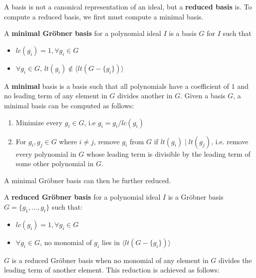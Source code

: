 A \Grobner basis is not a canonical representation of an ideal, but a
{\bf reduced \Grobner basis} is. To compute a reduced \Grobner basis, we
first must compute a minimal \Grobner basis.

\begin{Definition}\label{def:minigb}
A {\bf minimal Gr\"obner basis} for a polynomial ideal $I$ is a \Grobner basis $G$ for $I$ such that
	\begin{itemize}
		\item $lc(g_{i})=1,\forall g_{i}\in G$
		\item $\forall g_{i} \in G$,  $lt(g_{i}) \notin \langle lt(G-\{g_{i}\})\rangle$
	\end{itemize}
\end{Definition}
A {\bf minimal} \Grobner basis is a \Grobner basis such that all polynomials
have a coefficient of $1$ and no leading term of any element in $G$ divides 
another in $G$.
Given a \Grobner basis $G$, a minimal \Grobner basis can be
computed as follows:
\begin{enumerate}
\item Minimize every $g_i \in G$, i.e $g_i=g_i/lc(g_i)$
\item For $g_i, g_j \in G$ where $i\neq j$, remove $g_i$ from $G$ if $lt(g_i)\mid lt(g_j)$, i.e. remove every polynomial in $G$ whose leading term is divisible by the leading term of some other polynomial in $G$.
\end{enumerate}

A minimal Gr\"obner basis can then be further reduced.
\begin{Definition}
	A {\bf reduced Gr\"obner basis} for a polynomial ideal $I$ is a Gr\"obner basis $G=\{g_{1},\dots,g_{t}\}$ such that:
	\begin{itemize}
		\item $lc(g_{i})=1,\forall g_{i}\in G$
		\item $\forall g_{i} \in G$, no monomial of $g_{i}$ lies in $\langle lt(G-\{g_{i}\})\rangle$
	\end{itemize}
\end{Definition}
$G$ is a reduced Gr\"obner basis when no monomial of any element in $G$ 
divides the leading term of another element. 
This reduction is achieved as follows:


